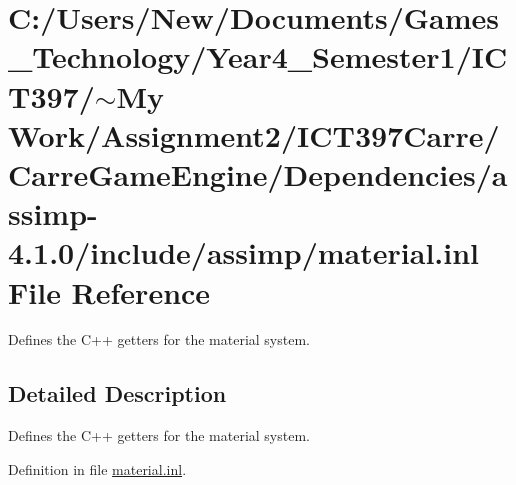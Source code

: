 \hypertarget{material_8inl}{
\section{C:/Users/New/Documents/Games\_\-Technology/Year4\_\-Semester1/ICT397/$\sim$My Work/Assignment2/ICT397Carre/CarreGameEngine/Dependencies/assimp-4.1.0/include/assimp/material.inl File Reference}
\label{material_8inl}
}
Defines the C++ getters for the material system. 



\subsection{Detailed Description}
Defines the C++ getters for the material system. 



Definition in file \hyperlink{material_8inl-source}{material.inl}.